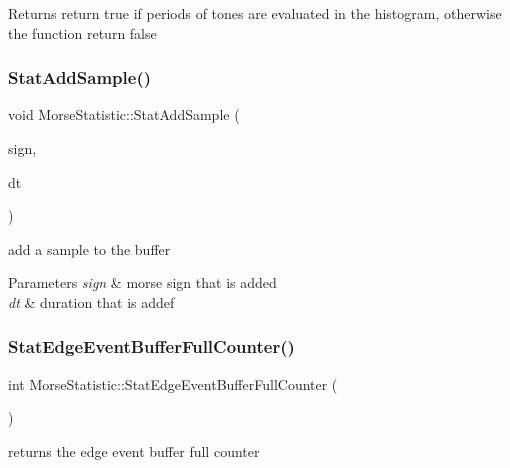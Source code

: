\begin{DoxyReturn}{Returns}
return true if periods of tones are evaluated in the histogram, otherwise the function return false 
\end{DoxyReturn}
\mbox{\label{classMorseStatistic_afc0c1198ba34c154ce613591861a339b}} 
\subsubsection{\texorpdfstring{Stat\+Add\+Sample()}{StatAddSample()}}
{\footnotesize\ttfamily void Morse\+Statistic\+::\+Stat\+Add\+Sample (\begin{DoxyParamCaption}\item[{Morse\+::\+Morse\+Sign}]{sign,  }\item[{double}]{dt }\end{DoxyParamCaption})\hspace{0.3cm}{\ttfamily [protected]}}



add a sample to the buffer 


\begin{DoxyParams}{Parameters}
{\em sign} & morse sign that is added \\
\hline
{\em dt} & duration that is addef \\
\hline
\end{DoxyParams}
\mbox{\label{classMorseStatistic_a92064ea196420fa75a5950a8bdab874e}} 
\subsubsection{\texorpdfstring{Stat\+Edge\+Event\+Buffer\+Full\+Counter()}{StatEdgeEventBufferFullCounter()}}
{\footnotesize\ttfamily int Morse\+Statistic\+::\+Stat\+Edge\+Event\+Buffer\+Full\+Counter (\begin{DoxyParamCaption}{ }\end{DoxyParamCaption})}



returns the edge event buffer full counter 

